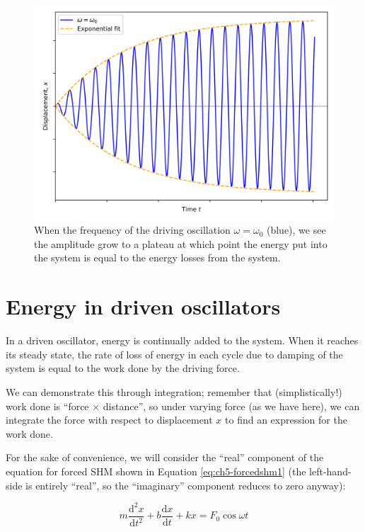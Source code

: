 \documentclass[
]{book}
\begin{document}
\begin{figure}

{\centering \includegraphics[width=0.7\linewidth]{visualisations/ch5-forcedosc5} 

}

\caption{When the frequency of the driving oscillation $\omega = \omega_0$ (blue), we see the amplitude grow to a plateau at which point the energy put into the system is equal to the energy losses from the system.}\label{fig:ch5-resonancedisplacement1}
\end{figure}

\hypertarget{sec-ch5-energydrivenoscillators}{%
\section{Energy in driven oscillators}\label{sec-ch5-energydrivenoscillators}}

In a driven oscillator, energy is continually added to the system. When it reaches its steady state, the rate of loss of energy in each cycle due to damping of the system is equal to the work done by the driving force.

We can demonstrate this through integration; remember that (simplistically!) work done is ``force \(\times\) distance'', so under varying force (as we have here), we can integrate the force with respect to displacement \(x\) to find an expression for the work done.

For the sake of convenience, we will consider the ``real'' component of the equation for forced SHM shown in Equation \eqref{eq:ch5-forcedshm1} (the left-hand-side is entirely ``real'', so the ``imaginary'' component reduces to zero anyway):

\begin{equation}
m \frac{\mathrm{d}^2 x}{\mathrm{d}t^2} + b \frac{\mathrm{d}x}{\mathrm{d}t}+ kx = F_0 \cos \omega t
\label{eq:ch5-oscillatorenergy1}
\end{equation}
\end{document}
